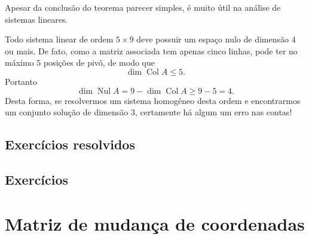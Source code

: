 \documentclass[../livro.tex]{subfiles}  %
\begin{document}
Apesar da conclusão do teorema parecer simples, é muito útil na análise de sistemas lineares.

\begin{example}
	Todo sistema linear de ordem $5 \times 9$ deve possuir um espaço nulo de dimensão $4$ ou mais. De fato, como a matriz associada tem apenas cinco linhas, pode ter no máximo $5$ posições de pivô, de modo que
	\begin{equation}
	\operatorname{dim} \operatorname{Col} A \le 5.
	\end{equation} Portanto
	\begin{equation}
	\operatorname{dim} \operatorname{Nul} A = 9 - \operatorname{dim} \operatorname{Col} A \ge 9 - 5 = 4.
	\end{equation} Desta forma, se resolvermos um sistema homogêneo desta ordem e encontrarmos um conjunto solução de dimensão 3, certamente  há algum um erro nas contas!
\end{example}












\subsection*{Exercícios resolvidos}

\construirExeresol

\subsection*{Exercícios}

\construirExer



\section{Matriz de mudança de coordenadas}
\end{document}
